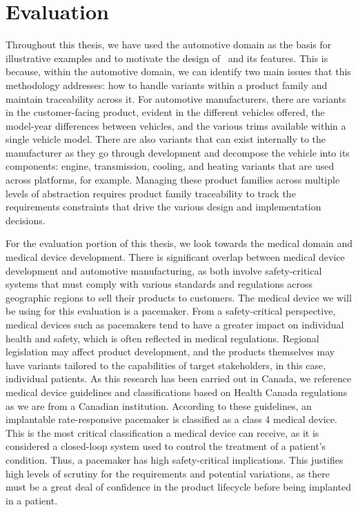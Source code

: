 \chapter{Evaluation}
\label{chap:Evaluation}

Throughout this thesis, we have used the automotive domain as the basis for illustrative examples and to motivate the design of \tool\ and its features. This is because, within the automotive domain, we can identify two main issues that this methodology addresses: how to handle variants within a product family and maintain traceability across it. For automotive manufacturers, there are variants in the customer-facing product, evident in the different vehicles offered, the model-year differences between vehicles, and the various trims available within a single vehicle model. There are also variants that can exist internally to the manufacturer as they go through development and decompose the vehicle into its components: engine, transmission, cooling, and heating variants that are used across platforms, for example. Managing these product families across multiple levels of abstraction requires product family traceability to track the requirements constraints that drive the various design and implementation decisions. 

For the evaluation portion of this thesis, we look towards the medical domain and medical device development. There is significant overlap between medical device development and automotive manufacturing, as both involve safety-critical systems that must comply with various standards and regulations across geographic regions to sell their products to customers. The medical device we will be using for this evaluation is a pacemaker. From a safety-critical perspective, medical devices such as pacemakers tend to have a greater impact on individual health and safety, which is often reflected in medical regulations. Regional legislation may affect product development, and the products themselves may have variants tailored to the capabilities of target stakeholders, in this case, individual patients. As this research has been carried out in Canada, we reference medical device guidelines and classifications based on Health Canada regulations~\cite{CanadaGuidanceDocument, VerifyDevices} as we are from a Canadian institution. According to these guidelines, an implantable rate-responsive pacemaker is classified as a class 4 medical device. This is the most critical classification a medical device can receive, as it is considered a closed-loop system used to control the treatment of a patient's condition. Thus, a pacemaker has high safety-critical implications. This justifies high levels of scrutiny for the requirements and potential variations, as there must be a great deal of confidence in the product lifecycle before being implanted in a patient.


